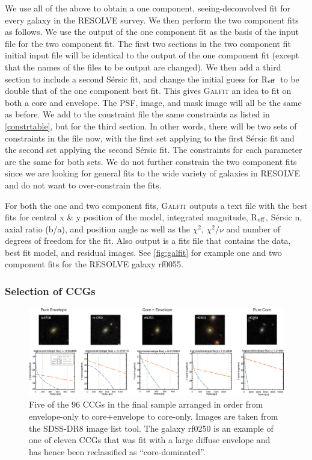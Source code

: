 \documentclass[iop,apj]{emulateapj}
\newcommand{\Reff}{R$_{\rm eff}$}
\begin{document}
  We use all of the above to obtain a one component, seeing-deconvolved fit for every galaxy in the RESOLVE survey. We then perform the two component fits as follows. We use the output of the one component fit as the basis of the input file for the two component fit. The first two sections in the two component fit initial input file will be identical to the output of the one component fit (except that the names of the files to be output are changed). We then add a third section to include a second S\'ersic fit, and change the initial guess for \Reff\ to be double that of the one component best fit. This gives \textsc{Galfit} an idea to fit on both a core and envelope. The PSF, image, and mask image will all be the same as before. We add to the constraint file the same constraints as listed in \autoref{constrtable}, but for the third section. In other words, there will be two sets of constraints in the file now, with the first set applying to the first S\'ersic fit and the second set applying the second S\'ersic fit. The constraints for each parameter are the same for both sets. We do not further constrain the two component fits since we are looking for general fits to the wide variety of galaxies in RESOLVE and do not want to over-constrain the fits.

For both the one and two component fits, \textsc{Galfit} outputs a text file with the best fits for central x \& y position of the model, integrated magnitude, \Reff, S\'ersic n, axial ratio (b/a), and position angle as well as the $\chi^2$, $\chi^2/\nu$ and number of degrees of freedom for the fit. Also output is a fits file that contains the data, best fit model, and residual images. See \autoref{fig:galfit} for example one and two component fits for the RESOLVE galaxy rf0055.

\subsubsection{Selection of CCGs}
\label{CCGs}

\begin{figure}[hbpt!]
\begin{center}
\includegraphics[scale=0.65]{coretoenvelopeims.eps}
\caption{Five of the 96 CCGs in the final sample arranged in order from envelope-only to core+envelope to core-only. Images are taken from the SDSS-DR8 image list tool. The galaxy rf0250 is an example of one of eleven CCGs that was fit with a large diffuse envelope and has hence been reclassified as ``core-dominated''.}
\label{fig:pics}
\end{center}
\end{figure}
\end{document}
